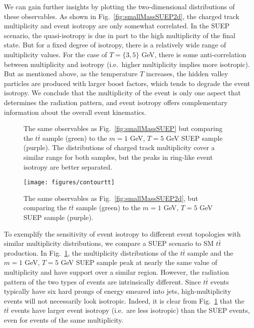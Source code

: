\documentclass[letterpaper,11pt]{article}
\DeclareRobustCommand{\Fig}[1]{Fig.~\ref{#1}}
\begin{document}
We can gain further insights by plotting the two-dimensional distributions of these observables.
%
As shown in \Fig{fig:smallMassSUEP2d}, the charged track multiplicity and event isotropy are only somewhat correlated.
%
In the SUEP scenario, the quasi-isotropy is due in part to the high multiplicity of the final state.
%
But for a fixed degree of isotropy, there is a relatively wide range of multiplicity values.
%
For the case of $T = \{3, 5\}$ GeV, there is some anti-correlation between multiplicity and isotropy (i.e.\ higher multiplicity implies more isotropic).
%
But as mentioned above, as the temperature $T$ increases, the hidden valley particles are produced with larger boost factors, which tends to degrade the event isotropy.
%
We conclude that the multiplicity of the event is only one aspect that determines the radiation pattern, and event isotropy offers complementary information about the overall event kinematics.


\begin{figure}[t!]
%
\centering
{}
     \hfill
{}
\caption{The same observables as \Fig{fig:smallMassSUEP} but comparing the $t\bar{t}$ sample (green) to the $m=1$ GeV, $T = 5$ GeV SUEP sample (purple). 
%
The distributions of charged track multiplicity cover a similar range for both samples, but the peaks in ring-like event isotropy are better separated.}
%
\label{fig:ttbarSuep}
\end{figure}

\begin{figure}[t!]
%
\centering
\texttt{[image: figures/contourtt]}
\caption{The same observables as \Fig{fig:smallMassSUEP2d}, but comparing the $t\bar{t}$ sample (green) to the $m=1$ GeV, $T = 5$ GeV SUEP sample (purple).}
%
\label{fig:ttbarSuep2d}
\end{figure}


To exemplify the sensitivity of event isotropy to different event topologies with similar multiplicity distributions, we compare a SUEP scenario to SM $t\bar{t}$ production. 
%
In \Fig{fig:ttbarSuep}, the multiplicity distributions of the $t\bar{t}$ sample and the $m = 1$ GeV, $T=5$ GeV SUEP sample peak at nearly the same value of multiplicity and have support over a similar region. 
%
However, the radiation pattern of the two types of events are intrinsically different. 
%
Since $t\bar{t}$ events typically have six hard prongs of energy smeared into jets, high-multiplicity events will not necessarily look isotropic. 
%
Indeed, it is clear from \Fig{fig:ttbarSuep} that the $t\bar{t}$ events have larger event isotropy (i.e.\ are less isotropic) than the SUEP events, even for events of the same multiplicity. 
\end{document}
